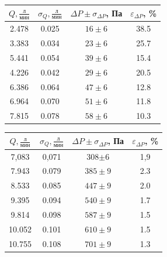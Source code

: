 \documentclass[a4paper]{article}
\begin{document}
\begin{enumerate}
\begin{multicols}{2}
\begin{center}
\end{center}
\vspace{1em}
\begin{center}
    \begin{tabular}{|c|c|c|c|}
        \hline
         $Q, \frac{\text{л}}{\text{мин}} $& $\sigma_Q, \frac{\text{л}}{\text{мин}} $& $\Delta P \pm \sigma_{\Delta P}$, Па & $\varepsilon_{\Delta P}$, \% \\
        \hline
        2.478 & 0.025 & $16 \pm 6$ & 38.5 \\ \hline
        3.383 & 0.034 & $23 \pm 6$ & 25.7 \\ \hline
        5.441 & 0.054 & $39 \pm 6$ & 15.4 \\ \hline
        4.226 & 0.042 & $29 \pm 6$ & 20.5 \\ \hline
        6.386 & 0.064 & $47 \pm 6$ & 12.8 \\ \hline
        6.964 & 0.070 & $51 \pm 6$ & 11.8 \\ \hline
        7.815 & 0.078 & $58 \pm 6$ & 10.3 \\ \hline
    \end{tabular}
\end{center}
\vspace{1em}
\begin{center}
    \begin{tabular}{|c|c|c|c|}
        \hline
        $Q, \frac{\text{л}}{\text{мин}}$ & $\sigma_Q, \frac{\text{л}}{\text{мин}}$ & $\Delta P \pm \sigma_{\Delta P}$, Па & $\varepsilon_{\Delta P}$, \% \\
        \hline
	   7,083 & 0,071 & 308\footnotemark[1] $\pm 6$ & 1,9 \\ \hline
        7.943 & 0.079 & $385 \pm 9$ & 2.3 \\ \hline
        8.533 & 0.085 & $447 \pm 9$ & 2.0 \\ \hline
        9.395 & 0.094 & $540 \pm 9$ & 1.7 \\ \hline
        9.814 & 0.098 & $587 \pm 9$ & 1.5 \\ \hline
        10.052 & 0.101 & $610 \pm 9$ & 1.5 \\ \hline
        10.755 & 0.108 & $701 \pm 9$ & 1.3 \\ \hline
    \end{tabular}
\end{center}

\end{multicols}
\end{enumerate}
\end{document}
